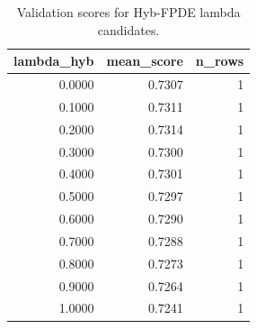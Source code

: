 \begin{table}[t]
\caption{Validation scores for Hyb-FPDE lambda candidates.}
\label{tab:lambda_distribution_computed}
\centering
\begin{tabular}{rrr}
\toprule
lambda\_hyb & mean\_score & n\_rows \\
\midrule
0.0000 & 0.7307 & 1 \\
0.1000 & 0.7311 & 1 \\
0.2000 & 0.7314 & 1 \\
0.3000 & 0.7300 & 1 \\
0.4000 & 0.7301 & 1 \\
0.5000 & 0.7297 & 1 \\
0.6000 & 0.7290 & 1 \\
0.7000 & 0.7288 & 1 \\
0.8000 & 0.7273 & 1 \\
0.9000 & 0.7264 & 1 \\
1.0000 & 0.7241 & 1 \\
\bottomrule
\end{tabular}

\end{table}
